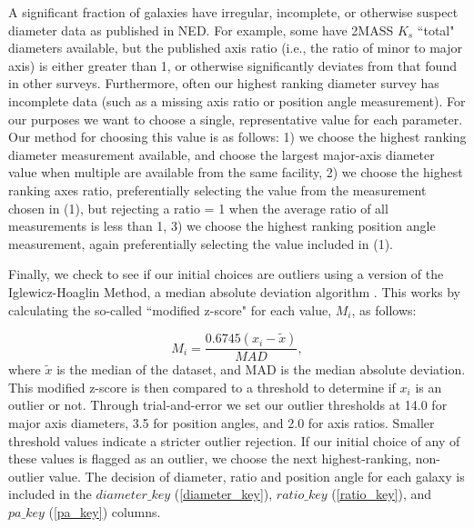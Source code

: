 A significant fraction of galaxies have irregular, incomplete, or otherwise suspect diameter data as published in NED. For example, some have 2MASS $K_s$ ``total" diameters available, but the published axis ratio (i.e., the ratio of minor to major axis) is either greater than 1, or otherwise significantly deviates from that found in other surveys. Furthermore, often our highest ranking diameter survey has incomplete data (such as a missing axis ratio or position angle measurement). For our purposes we want to choose a single, representative value for each parameter. Our method for choosing this value is as follows: 1) we choose the highest ranking diameter measurement available, and choose the largest major-axis diameter value when multiple are available from the same facility, 2) we choose the highest ranking axes ratio, preferentially selecting the value from the measurement chosen in (1), but rejecting a ratio = 1 when the average ratio of all measurements is less than 1, 3) we choose the highest ranking position angle measurement, again preferentially selecting the value included in (1).

Finally, we check to see if our initial choices are outliers using a version of the Iglewicz-Hoaglin Method, a median absolute deviation algorithm \citep{iglewicz1993}. This works by calculating the so-called ``modified z-score" for each value, $M_i$, as follows:

\begin{equation}
M_{i} = \frac{0.6745 (x_i - \tilde{x})}{MAD},
\end{equation}
\noindent where $\tilde{x}$ is the median of the dataset, and MAD is the median absolute deviation. This modified z-score is then compared to a threshold to determine if $x_i$ is an outlier or not. Through trial-and-error we set our outlier thresholds at 14.0 for major axis diameters, 3.5 for position angles, and 2.0 for axis ratios. Smaller threshold values indicate a stricter outlier rejection. If our initial choice of any of these values is flagged as an outlier, we choose the next highest-ranking, non-outlier value. The decision of diameter, ratio and position angle for each galaxy is included in the $diameter\_key$ (\ref{diameter_key}), $ratio\_key$ (\ref{ratio_key}), and $pa\_key$ (\ref{pa_key}) columns.





